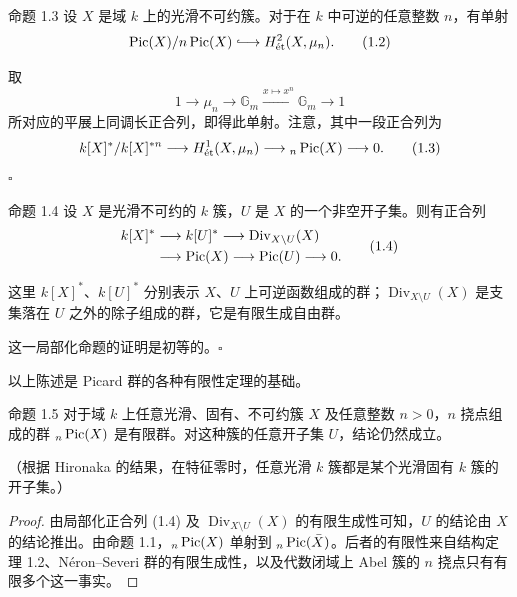 \begin{statement}{命题 1.3}
设 $X$ 是域 $k$ 上的光滑不可约簇。对于在 $k$ 中可逆的任意整数 $n$，有单射
\begin{equation*}
\Pic(X)/n\Pic(X)\lhook\joinrel\longrightarrow H^2_{\et}(X,\mu_n).\tag{1.2}
\end{equation*}
\end{statement}
取 
\[
1\longrightarrow\mu_n\longrightarrow\mathbb G_m\xrightarrow{x\mapsto x^n}\mathbb G_m\longrightarrow1
\]
所对应的平展上同调长正合列，即得此单射。注意，其中一段正合列为
\begin{equation*}
k[X]^*/k[X]^{*n}\longrightarrow H^1_{\mathrm{\acute et}}(X,\mu_n)\longrightarrow{}_n\operatorname{Pic}(X)\longrightarrow0.\tag{1.3}
\end{equation*}
\hfill$\square$

\begin{statement}{命题 1.4}
设 $X$ 是光滑不可约的 $k$ 簇，$U$ 是 $X$ 的一个非空开子集。则有正合列
\begin{equation*}
\begin{split}
k[X]^* &\longrightarrow k[U]^*\longrightarrow\operatorname{Div}_{X\setminus U}(X)\\
&\longrightarrow\operatorname{Pic}(X)\longrightarrow\operatorname{Pic}(U)\longrightarrow0.
\end{split}\tag{1.4}
\end{equation*}
\end{statement}
这里 $k[X]^*$、$k[U]^*$ 分别表示 $X$、$U$ 上可逆函数组成的群；$\operatorname{Div}_{X\setminus U}(X)$ 是支集落在 $U$ 之外的除子组成的群，它是有限生成自由群。

这一局部化命题的证明是初等的。\hfill$\square$

以上陈述是 Picard 群的各种有限性定理的基础。

\begin{statement}{命题 1.5}
对于域 $k$ 上任意光滑、固有、不可约簇 $X$ 及任意整数 $n>0$，$n$ 挠点组成的群 ${}_n\operatorname{Pic}(X)$ 是有限群。对这种簇的任意开子集 $U$，结论仍然成立。
\end{statement}
（根据 Hironaka 的结果，在特征零时，任意光滑 $k$ 簇都是某个光滑固有 $k$ 簇的开子集。）
\begin{proof}
由局部化正合列 (1.4) 及 $\operatorname{Div}_{X\setminus U}(X)$ 的有限生成性可知，$U$ 的结论由 $X$ 的结论推出。由命题 1.1，${}_n\operatorname{Pic}(X)$ 单射到 ${}_n\operatorname{Pic}(\bar X)$。后者的有限性来自结构定理 1.2、Néron--Severi 群的有限生成性，以及代数闭域上 Abel 簇的 $n$ 挠点只有有限多个这一事实。
\end{proof}
